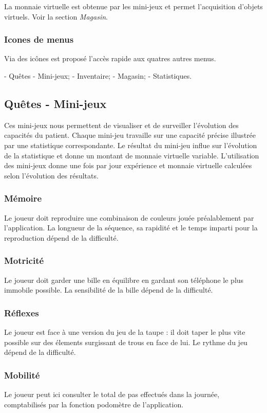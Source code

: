 \documentclass[a4paper,12pt,francais]{article}
\begin{document}
La monnaie virtuelle est obtenue par les mini-jeux et permet l'acquisition d'objets virtuels. Voir la section \emph{Magasin}.

\subsubsection{Icones de menus}

Via des icônes est proposé l'accès rapide aux quatres autres menus.

- Quêtes - Mini-jeux;
- Inventaire;
- Magasin;
- Statistiques.

\subsection{Quêtes - Mini-jeux}

Ces mini-jeux nous permettent de visualiser et de surveiller l'évolution des capacités du patient. Chaque mini-jeu travaille sur une capacité précise illustrée par une statistique correspondante. Le résultat du mini-jeu influe sur l'évolution de la statistique et donne un montant de monnaie virtuelle variable.
L'utilisation des mini-jeux donne une fois par jour expérience et monnaie virtuelle calculées selon l'évolution des résultats.

\subsubsection{Mémoire}
Le joueur doit reproduire une combinaison de couleurs jouée préalablement par l'application. La longueur de la séquence, sa rapidité et le temps imparti pour la reproduction dépend de la difficulté.

\subsubsection{Motricité}
Le joueur doit garder une bille en équilibre en gardant son téléphone le plus immobile possible. La sensibilité de la bille dépend de la difficulté.

\subsubsection{Réflexes}
Le joueur est face à une version du jeu de la taupe : il doit taper le plus vite possible sur des élements surgissant de trous en face de lui. Le rythme du jeu dépend de la difficulté.

\subsubsection{Mobilité}
Le joueur peut ici consulter le total de pas effectués dans la journée, comptabilisés par la fonction podomètre de l'application.
\end{document}
